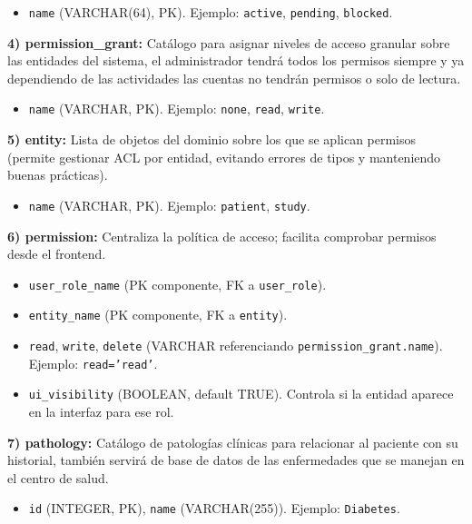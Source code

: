 \documentclass[12pt, a4paper]{article}
\begin{document}
\begin{itemize}
	\item \texttt{name} (VARCHAR(64), PK). Ejemplo: \texttt{active}, \texttt{pending}, \texttt{blocked}.
\end{itemize}


\textbf{4) permission\_grant:} Catálogo para asignar niveles de acceso granular sobre las entidades del sistema, el administrador tendrá todos los permisos siempre y ya dependiendo de las actividades las cuentas no tendrán permisos o solo de lectura.


\begin{itemize}
	\item \texttt{name} (VARCHAR, PK). Ejemplo: \texttt{none}, \texttt{read}, \texttt{write}.
\end{itemize}

\textbf{5) entity:} Lista de objetos del dominio sobre los que se aplican permisos (permite gestionar ACL por entidad, evitando errores de tipos y manteniendo buenas prácticas).

\begin{itemize}
	\item \texttt{name} (VARCHAR, PK). Ejemplo: \texttt{patient}, \texttt{study}.
\end{itemize}



\textbf{6) permission:} Centraliza la política de acceso; facilita comprobar permisos desde el frontend.
\begin{itemize}
	\item \texttt{user\_role\_name} (PK componente, FK a \texttt{user\_role}).
	\item \texttt{entity\_name} (PK componente, FK a \texttt{entity}).
	\item \texttt{read}, \texttt{write}, \texttt{delete} (VARCHAR referenciando \texttt{permission\_grant.name}). Ejemplo: \texttt{read='read'}.
	\item \texttt{ui\_visibility} (BOOLEAN, default TRUE). Controla si la entidad aparece en la interfaz para ese rol.
\end{itemize}





\textbf{7) pathology:} Catálogo de patologías clínicas para relacionar al paciente con su historial, también servirá de base de datos de las enfermedades que se manejan en el centro de salud.
\begin{itemize}
	\item \texttt{id} (INTEGER, PK), \texttt{name} (VARCHAR(255)). Ejemplo: \texttt{Diabetes}.
\end{itemize}
\end{document}
